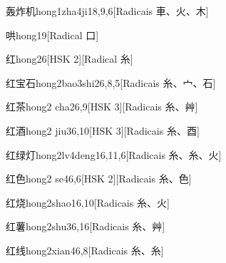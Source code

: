\begin{entry}{轰炸机}{hong1zha4ji1}{8,9,6}[Radicais ⾞、⽕、⽊]
\end{entry}

\begin{entry}{哄}{hong1}{9}[Radical ⼝]
\end{entry}

\begin{entry}{红}{hong2}{6}[HSK 2][Radical ⽷]
\end{entry}

\begin{entry}{红宝石}{hong2bao3shi2}{6,8,5}[Radicais ⽷、⼧、⽯]
\end{entry}

\begin{entry}{红茶}{hong2 cha2}{6,9}[HSK 3][Radicais ⽷、⾋]
\end{entry}

\begin{entry}{红酒}{hong2 jiu3}{6,10}[HSK 3][Radicais ⽷、⾣]
\end{entry}

\begin{entry}{红绿灯}{hong2lv4deng1}{6,11,6}[Radicais ⽷、⽷、⽕]
\end{entry}

\begin{entry}{红色}{hong2 se4}{6,6}[HSK 2][Radicais ⽷、⾊]
\end{entry}

\begin{entry}{红烧}{hong2shao1}{6,10}[Radicais ⽷、⽕]
\end{entry}

\begin{entry}{红薯}{hong2shu3}{6,16}[Radicais ⽷、⾋]
\end{entry}

\begin{entry}{红线}{hong2xian4}{6,8}[Radicais ⽷、⽷]
\end{entry}

